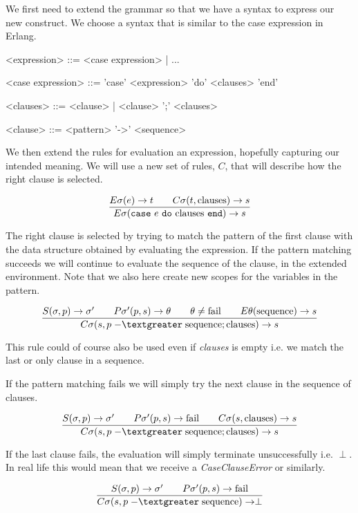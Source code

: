 \documentclass[a4paper,11pt]{article}
\begin{document}
We first need to extend the grammar so that we have a syntax to express
our new construct. We choose a syntax that is similar to the case
expression in Erlang.

\begin{grammar}
     <expression> ::=  <case expression> | ...  

     <case expression> ::= 'case' <expression> 'do' <clauses>  'end' 

     <clauses> ::=   <clause> | <clause> ';' <clauses>

     <clause> ::=  <pattern> '-\textgreater' <sequence>
\end{grammar}

We then extend the rules for evaluation an expression, hopefully
capturing our intended meaning. We will use a new set of rules, $C$,
that will describe how the right clause is selected. 


$$\frac{E\sigma(e) \rightarrow t \qquad C\sigma(t, {\rm clauses}) \rightarrow s }{E\sigma({\tt case}\ e \ {\tt do}\ {\rm clauses} \ {\tt end}) \rightarrow s}$$

The right clause is selected by trying to match the pattern of the
first clause with the data structure obtained by evaluating the
expression. If the pattern matching succeeds we will continue to
evaluate the sequence of the clause, in the extended environment. Note
that we also here create new scopes for the variables in the pattern.

$$\frac{
  S(\sigma, p) \rightarrow \sigma' \qquad
  P\sigma'(p, s) \rightarrow \theta \qquad
  \theta \not = {\rm fail} \qquad
  E\theta({\rm sequence}) \rightarrow s}{
C\sigma(s, p \;{\rm -\textgreater}\;    {\rm sequence} ; {\rm clauses}) \rightarrow s}$$

This rule could of course also be used even if {\em clauses} is empty
i.e. we match the last or only clause in a sequence.

If the pattern matching fails we will simply try the next clause in
the sequence of clauses.

$$\frac{
  S(\sigma, p) \rightarrow \sigma' \qquad
  P\sigma'(p, s) \rightarrow {\rm fail} \qquad
  C\sigma(s, {\rm clauses}) \rightarrow s}{
C\sigma(s, p \;{\rm -\textgreater}\;  {\rm sequence} ; {\rm clauses}) \rightarrow s}$$

If the last clause fails, the evaluation will simply terminate
unsuccessfully i.e. $\perp$. In real life this would mean that we
receive a {\em CaseClauseError} or similarly.

$$\frac{
  S(\sigma, p) \rightarrow \sigma' \qquad
  P\sigma'(p, s) \rightarrow {\rm fail}}{
C\sigma(s, p \;{\rm -\textgreater}\;  {\rm sequence}) \rightarrow \perp}$$
\end{document}
